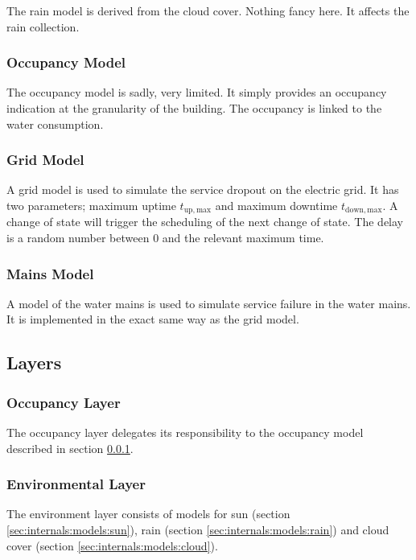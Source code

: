 \documentclass[10pt]{article}
\begin{document}
The rain model is derived from the cloud cover. Nothing fancy here. It affects the rain collection.

\subsubsection{Occupancy Model}
\label{sec:internals:models:occupancy}

The occupancy model is sadly, very limited. It simply provides an occupancy indication at the granularity of the building. The occupancy is linked to the water consumption.

\subsubsection{Grid Model}
\label{sec:internals:models:grid}

A grid model is used to simulate the service dropout on the electric grid. It has two parameters; maximum uptime $t_{\mathrm{up, max}}$ and maximum downtime $t_{\mathrm{down, max}}$. A change of state will trigger the scheduling of the next change of state. The delay is a random number between 0 and the relevant maximum time.

\subsubsection{Mains Model}
\label{sec:internals:models:mains}

A model of the water mains is used to simulate service failure in the water mains. It is implemented in the exact same way as the grid model.

\subsection{Layers}

\subsubsection{Occupancy Layer}

The occupancy layer delegates its responsibility to the occupancy model described in section \ref{sec:internals:models:occupancy}.

\subsubsection{Environmental Layer}

The environment layer consists of models for sun (section \ref{sec:internals:models:sun}), rain (section \ref{sec:internals:models:rain}) and cloud cover (section \ref{sec:internals:models:cloud}).
\end{document}
